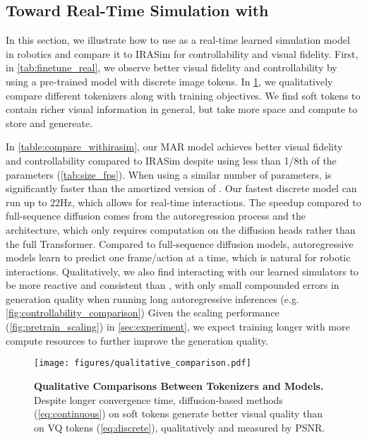 \subsection{Toward Real-Time Simulation with \ourshort}
\label{exp:finetune_real}
In this section, we illustrate how to use \ourshort as a real-time learned simulation model in robotics and compare it to IRASim \cite{zhu2024irasim} for controllability and visual fidelity.  First, in \cref{tab:finetune_real}, we observe better visual fidelity and controllability by using a pre-trained \ourshort model with discrete image tokens. In  \cref{fig:tokenizer}, we qualitatively compare different tokenizers along with training objectives. We find soft tokens to contain richer visual information in general, but take more space and compute to store and genereate.


In \cref{table:compare_withirasim}, our MAR model achieves better visual fidelity and controllability compared to IRASim \cite{zhu2024irasim} despite using less than 1/8th of the parameters (\cref{tab:size_fps}).   When using a similar number of parameters, \ourshort is significantly faster than the amortized version of \cite{zhu2024irasim}. Our fastest discrete model can run up to 22Hz, which allows for real-time interactions. The speedup compared to full-sequence diffusion comes from the autoregression process and the architecture, which only requires computation on the diffusion heads rather than the full Transformer. Compared to full-sequence diffusion models, autoregressive models learn to predict one frame/action at a time, which is natural for robotic interactions. Qualitatively, we also find interacting with our learned simulators to be more reactive and consistent than \cite{zhu2024irasim}, with only small compounded errors in generation quality when running long autoregressive inferences (e.g. \cref{fig:controllability_comparison}) Given the scaling performance (\eg  \cref{fig:pretrain_scaling}) in \cref{sec:experiment}, we expect training longer with more compute resources to further improve the generation quality. 

\begin{figure}[t]
\centering
\texttt{[image: figures/qualitative\_comparison.pdf]}
\caption{\label{fig:tokenizer}\textbf{Qualitative Comparisons Between Tokenizers and Models.} Despite longer convergence time, diffusion-based methods (\cref{eq:continuous}) on soft tokens generate better visual quality than on VQ tokens (\cref{eq:discrete}), qualitatively and measured by PSNR.}
\vspace{-2mm}
\end{figure}

